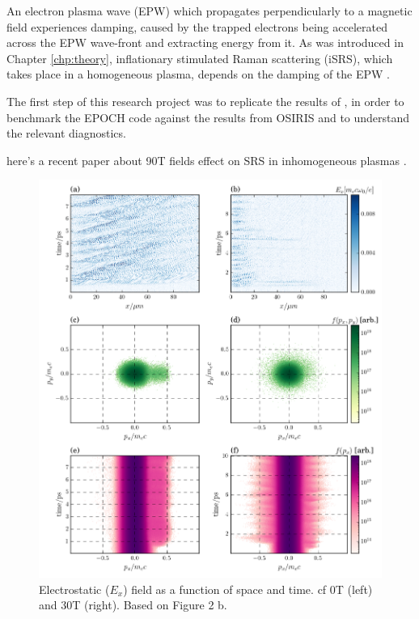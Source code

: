 An electron plasma wave (\acrshort{EPW}) which propagates perpendicularly to a magnetic field experiences damping, caused by the trapped electrons being accelerated across the EPW wave-front and extracting energy from it. As was introduced in Chapter \ref{chp:theory}, inflationary stimulated Raman scattering (\acrshort{iSRS}), which takes place in a homogeneous plasma, depends on the damping of the EPW .

The first step of this research project was to replicate the results of \citet{Winjum2018}, in order to benchmark the EPOCH code against the results from OSIRIS and to understand the relevant diagnostics. 

here's a recent paper about 90T fields effect on SRS in inhomogeneous plasmas \citep{Zhou2021}. 



\begin{figure}[ht]
   \centering
    \includegraphics[width=\columnwidth]{Chapters/C6_magSRS/Winjum_rep_megaPlot.png}
    \caption{Electrostatic ($E_x$) field as a function of space and time. cf 0T (left) and 30T (right). Based on Figure 2 b. \citep{Winjum2018}}
    \label{fig:WinjumRep}
\end{figure}{}


